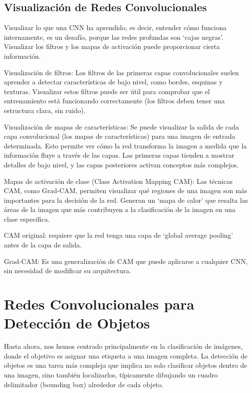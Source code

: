 \documentclass{article}
\begin{document}
\subsection{Visualización de Redes Convolucionales}
Visualizar lo que una CNN ha aprendido, es decir, entender cómo funciona internamente, es un desafío, porque las redes profundas son `cajas negras'. Visualizar los filtros y los mapas de activación puede proporcionar cierta información.

Visualización de filtros: Los filtros de las primeras capas convolucionales suelen aprender a detectar características de bajo nivel, como bordes, esquinas y texturas. Visualizar estos filtros puede ser útil para comprobar que el entrenamiento está funcionando correctamente (los filtros deben tener una estructura clara, sin ruido).

Visualización de mapas de características: Se puede visualizar la salida de cada capa convolucional (los mapas de características) para una imagen de entrada determinada.  Esto permite ver cómo la red transforma la imagen a medida que la información fluye a través de las capas. Las primeras capas tienden a mostrar detalles de bajo nivel, y las capas posteriores activan conceptos más complejos.

Mapas de activación de clase (Class Activation Mapping CAM): Las técnicas CAM, como Grad-CAM, permiten visualizar qué regiones de una imagen son más importantes para la decisión de la red.  Generan un `mapa de calor' que resalta las áreas de la imagen que más contribuyen a la clasificación de la imagen en una clase específica.

CAM original: requiere que la red tenga una capa de `global average pooling' antes de la capa de salida.

Grad-CAM: Es una generalización de CAM que puede aplicarse a cualquier CNN, sin necesidad de modificar su arquitectura.

\section{Redes Convolucionales para Detección de Objetos}

Hasta ahora, nos hemos centrado principalmente en la clasificación de imágenes, donde el objetivo es asignar una etiqueta a una imagen completa. La detección de objetos es una tarea más compleja que implica no solo clasificar objetos dentro de una imagen, sino también localizarlos, típicamente dibujando un cuadro delimitador (bounding box) alrededor de cada objeto.
\end{document}
